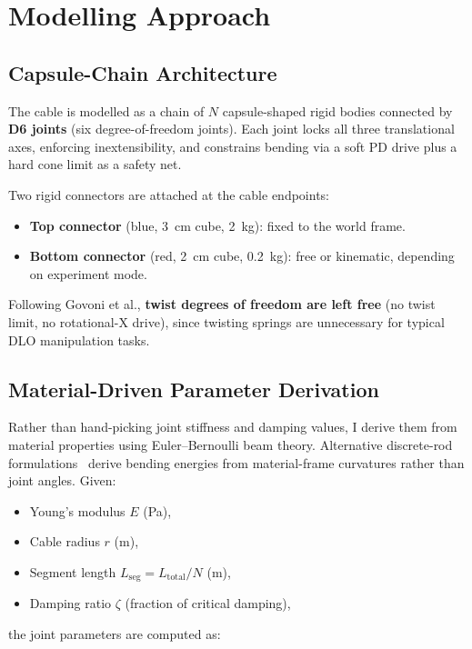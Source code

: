 \documentclass[11pt,a4paper]{article}
\begin{document}
\section{Modelling Approach}

\subsection{Capsule-Chain Architecture}

The cable is modelled as a chain of $N$ capsule-shaped rigid bodies connected
by \textbf{D6 joints} (six degree-of-freedom joints).  Each joint locks all
three translational axes, enforcing inextensibility, and constrains bending
via a soft PD drive plus a hard cone limit as a safety net.

Two rigid connectors are attached at the cable endpoints:
\begin{itemize}[nosep]
    \item \textbf{Top connector} (blue, \SI{3}{cm} cube, \SI{2}{kg}): fixed to the world frame.
    \item \textbf{Bottom connector} (red, \SI{2}{cm} cube, \SI{0.2}{kg}): free
          or kinematic, depending on experiment mode.
\end{itemize}

Following Govoni et al., \textbf{twist degrees of freedom are left free}
(no twist limit, no rotational-X drive), since twisting springs are unnecessary
for typical DLO manipulation tasks.

\subsection{Material-Driven Parameter Derivation}

Rather than hand-picking joint stiffness and damping values, I derive them
from material properties using Euler--Bernoulli beam theory.  Alternative
discrete-rod formulations~\cite{bergou2008} derive bending energies from
material-frame curvatures rather than joint angles.  Given:
\begin{itemize}[nosep]
    \item Young's modulus $E$ (\si{Pa}),
    \item Cable radius $r$ (\si{m}),
    \item Segment length $L_{\text{seg}} = L_{\text{total}} / N$ (\si{m}),
    \item Damping ratio $\zeta$ (fraction of critical damping),
\end{itemize}
the joint parameters are computed as:
\end{document}
